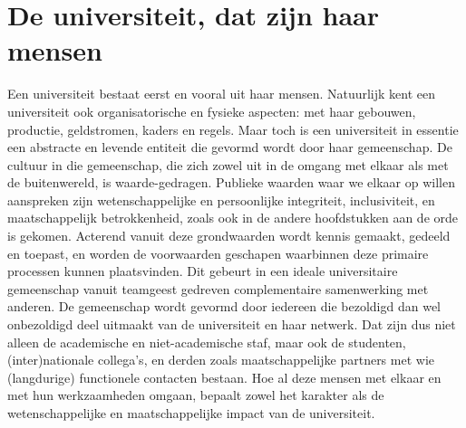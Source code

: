 \documentclass{jote-book}
\begin{document}
	\section{De universiteit, dat zijn haar mensen }



	Een universiteit bestaat eerst en vooral uit haar mensen. Natuurlijk kent een universiteit ook organisatorische en fysieke aspecten: met haar gebouwen, productie, geldstromen, kaders en regels. Maar toch is een universiteit in essentie een abstracte en levende entiteit die gevormd wordt door haar gemeenschap. De cultuur in die gemeenschap, die zich zowel uit in de omgang met elkaar als met de buitenwereld, is waarde-gedragen. Publieke waarden waar we elkaar op willen aanspreken zijn wetenschappelijke en persoonlijke integriteit, inclusiviteit, en maatschappelijk betrokkenheid, zoals ook in de andere hoofdstukken aan de orde is gekomen. Acterend vanuit deze grondwaarden wordt kennis gemaakt, gedeeld en toepast, en worden de voorwaarden geschapen waarbinnen deze primaire processen kunnen plaatsvinden. Dit gebeurt in een ideale universitaire gemeenschap vanuit teamgeest gedreven complementaire samenwerking met anderen. De gemeenschap wordt gevormd door iedereen die bezoldigd dan wel onbezoldigd deel uitmaakt van de universiteit en haar netwerk. Dat zijn dus niet alleen de academische en niet-academische staf, maar ook de studenten, (inter)nationale collega's, en derden zoals maatschappelijke partners met wie (langdurige) functionele contacten bestaan. Hoe al deze mensen met elkaar en met hun werkzaamheden omgaan, bepaalt zowel het karakter als de wetenschappelijke en maatschappelijke impact van de universiteit.
\end{document}

